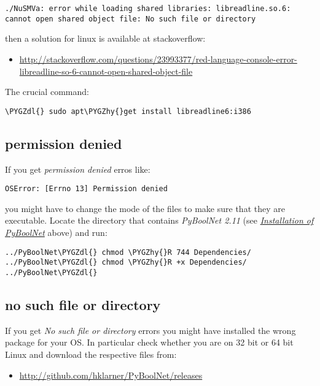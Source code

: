 \documentclass[letterpaper,10pt,english]{sphinxmanual}
\def\PYGZdl{\char`\$}
\def\PYGZhy{\char`\-}
\begin{document}
\begin{Verbatim}[commandchars=\\\{\}]
./NuSMVa: error while loading shared libraries: libreadline.so.6:
cannot open shared object file: No such file or directory
\end{Verbatim}

then a solution for linux is available at stackoverflow:
\begin{itemize}
\item {} 
\href{http://stackoverflow.com/questions/23993377/red-language-console-error-libreadline-so-6-cannot-open-shared-object-file}{http://stackoverflow.com/questions/23993377/red-language-console-error-libreadline-so-6-cannot-open-shared-object-file}

\end{itemize}

The crucial command:

\begin{Verbatim}[commandchars=\\\{\}]
\PYGZdl{} sudo apt\PYGZhy{}get install libreadline6:i386
\end{Verbatim}


\subsection{permission denied}
\label{Installation:permission-denied}
If you get \emph{permission denied} erros like:

\begin{Verbatim}[commandchars=\\\{\}]
OSError: [Errno 13] Permission denied
\end{Verbatim}

you might have to change the mode of the files to make sure that they are executable.
Locate the directory that contains \emph{PyBoolNet 2.11} (see {\hyperref[Installation:installation-software]{\emph{Installation of PyBoolNet}}} above) and run:

\begin{Verbatim}[commandchars=\\\{\}]
../PyBoolNet\PYGZdl{} chmod \PYGZhy{}R 744 Dependencies/
../PyBoolNet\PYGZdl{} chmod \PYGZhy{}R +x Dependencies/
../PyBoolNet\PYGZdl{}
\end{Verbatim}


\subsection{no such file or directory}
\label{Installation:no-such-file-or-directory}
If you get \emph{No such file or directory} errors you might have installed the wrong package for your OS. In particular check whether you are on 32 bit or 64 bit Linux and download the respective files from:
\begin{itemize}
\item {} 
\href{http://github.com/hklarner/PyBoolNet/releases}{http://github.com/hklarner/PyBoolNet/releases}

\end{itemize}
\end{document}
